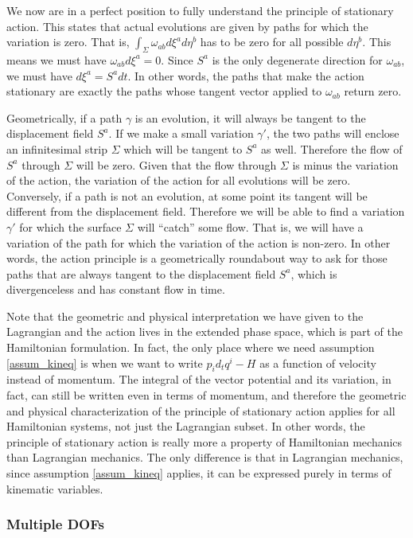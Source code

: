 We now are in a perfect position to fully understand the principle of stationary action. This states that actual evolutions are given by paths for which the variation is zero. That is, $\int_{\Sigma} \omega_{ab} d\xi^a d\eta^b$ has to be zero for all possible $d\eta^b$. This means we must have $\omega_{ab} d\xi^a = 0$. Since $S^a$ is the only degenerate direction for $\omega_{ab}$, we must have $d\xi^a = S^a dt$. In other words, the paths that make the action stationary are exactly the paths whose tangent vector applied to $\omega_{ab}$ return zero.

Geometrically, if a path $\gamma$ is an evolution, it will always be tangent to the displacement field $S^a$. If we make a small variation $\gamma'$, the two paths will enclose an infinitesimal strip $\Sigma$ which will be tangent to $S^a$ as well. Therefore the flow of $S^a$ through $\Sigma$ will be zero. Given that the flow through $\Sigma$ is minus the variation of the action, the variation of the action for all evolutions will be zero. Conversely, if a path is not an evolution, at some point its tangent will be different from the displacement field. Therefore we will be able to find a variation $\gamma'$ for which the surface $\Sigma$ will ``catch'' some flow. That is, we will have a variation of the path for which the variation of the action is non-zero. In other words, the action principle is a geometrically roundabout way to ask for those paths that are always tangent to the displacement field $S^a$, which is divergenceless and has constant flow in time.

Note that the geometric and physical interpretation we have given to the Lagrangian and the action lives in the extended phase space, which is part of the Hamiltonian formulation. In fact, the only place where we need assumption \ref{assum_kineq} is when we want to write $p_i d_t q^i - H$ as a function of velocity instead of momentum. The integral of the vector potential and its variation, in fact, can still be written even in terms of momentum, and therefore the geometric and physical characterization of the principle of stationary action applies for all Hamiltonian systems, not just the Lagrangian subset. In other words, the principle of stationary action is really more a property of Hamiltonian mechanics than Lagrangian mechanics. The only difference is that in Lagrangian mechanics, since assumption \ref{assum_kineq} applies, it can be expressed purely in terms of kinematic variables.

\subsubsection{Multiple DOFs}

